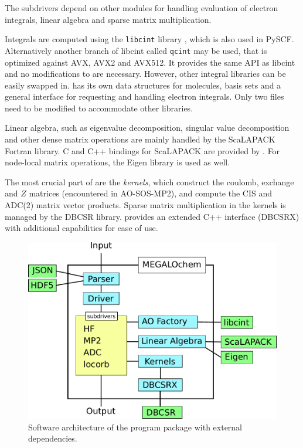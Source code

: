 The subdrivers depend on other modules for handling evaluation of electron integrals, linear algebra and sparse matrix multiplication. 

Integrals are computed using the \texttt{libcint} library \cite{Sun2015}, which is also used in PySCF. Alternatively another branch of libcint called \texttt{qcint} may be used, that is optimized against AVX, AVX2 and AVX512. It provides the same API as libcint and no modifications to \mchem{} are necessary. However, other integral libraries can be easily swapped in. \mchem{} has its own data structures for molecules, basis sets and a general interface for requesting and handling electron integrals. Only two files need to be modified to accommodate other libraries. 

Linear algebra, such as eigenvalue decomposition, singular value decomposition and other dense matrix operations are mainly handled by the ScaLAPACK Fortran library. C and C++ bindings for ScaLAPACK are provided by \mchem{}. For node-local matrix operations, the Eigen library is used as well. 

The most crucial part of \mchem{} are the \emph{kernels}, which construct the coulomb, exchange and $Z$ matrices (encountered in AO-SOS-MP2), and compute the CIS and ADC(2) matrix vector products. Sparse matrix multiplication in the kernels is managed by the DBCSR library. \mchem{} provides an extended C++ interface (DBCSRX) with additional capabilities for ease of use. 

\begin{figure}
\centering
\includegraphics[scale=0.8]{Pics/megasoft}
\caption{Software architecture of the \mchem{} program package with external dependencies.}
\label{fig:MEGAARCH}
\end{figure}

